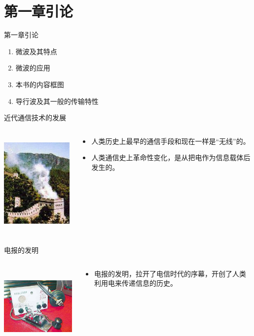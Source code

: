 \section{第一章\quad 引论}
\begin{frame}{第一章\quad 引论}
 \begin{enumerate}
  \item 微波及其特点
  \item 微波的应用
  \item 本书的内容框图
  \item 导行波及其一般的传输特性
 \end{enumerate}
\end{frame}

\begin{frame}{近代通信技术的发展}
 \begin{columns}
  \begin{column}{0.35\linewidth}
   \centering
   \includegraphics[height=5cm]{fenghuotai2.jpg}
  \end{column}
  \begin{column}{0.65\linewidth}
   \centering
   \begin{itemize}
    \item 人类历史上最早的通信手段和现在一样是“无线”的。
    \item 人类通信史上革命性变化，是从把电作为信息载体后发生的。
   \end{itemize}
  \end{column}
 \end{columns}
\end{frame}

\begin{frame}{电报的发明}
 \begin{columns}
  \begin{column}{0.5\linewidth}
   \includegraphics[height=4cm]{dianbao}
  \end{column}
  \begin{column}{0.5\linewidth}
   \begin{itemize}
    \item 电报的发明，拉开了电信时代的序幕，开创了人类利用电来传递信息的历史。
   \end{itemize}
  \end{column}
 \end{columns}
\end{frame}

